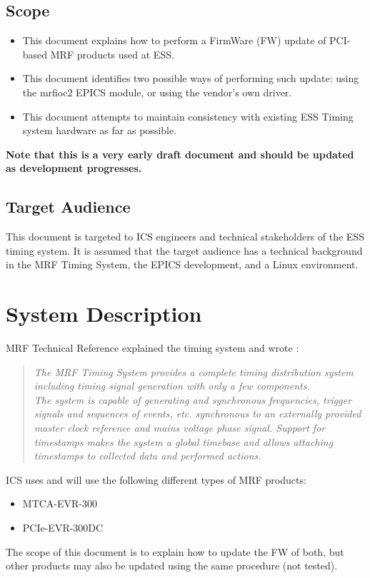 \documentclass[11pt
  , a4paper
  , article
  , oneside
  , showtrims
]{memoir}
\begin{document}
\section{Scope}
\begin{itemize}
\item This document explains how to perform a FirmWare (FW) update of PCI-based MRF products used at ESS.
\item This document identifies two possible ways of performing such update: using the mrfioc2 EPICS module, or using the vendor's own driver.
\item This document attempts to maintain consistency with existing ESS Timing system hardware as far as possible.
\end{itemize}
\textbf{Note that this is a very early draft document and should be updated as development progresses.}

\section{Target Audience}
This document is targeted to ICS engineers and technical stakeholders of the ESS timing system. It is assumed that the target audience has a technical background in the MRF Timing System, the EPICS development, and a Linux environment.

\chapter{System Description}
MRF Technical Reference \citep[see][p5]{MRFEVENTSYSTEMDC} explained the timing system and wrote :
\blockquote{\textit{The MRF Timing System provides a complete timing distribution system including timing signal generation with only a few components.\\The system is capable of generating and synchronous frequencies, trigger signals and sequences of events, etc. synchronous to an externally provided master clock reference and mains voltage phase signal. Support for timestamps makes the system a global timebase and allows attaching timestamps to collected data and performed actions.}}

ICS uses and will use the following different types of MRF products:
\begin{itemize}
\item MTCA-EVR-300
\item PCIe-EVR-300DC
\end{itemize}

The scope of this document is to explain how to update the FW of both, but other products may also be updated using the same procedure (not tested).
\end{document}
